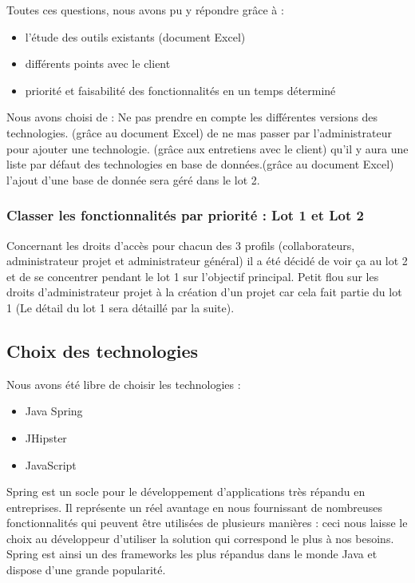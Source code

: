 Toutes ces questions, nous avons pu y répondre grâce à :
\begin{itemize}
\item l'étude des outils existants (document Excel)
\item différents points avec le client
\item priorité et faisabilité des fonctionnalités en un temps déterminé
\end{itemize}

Nous avons choisi de :
Ne pas prendre en compte les différentes versions des technologies. (grâce au document Excel)
de ne mas passer par l'administrateur pour ajouter une technologie. (grâce aux entretiens avec le client)
qu'il y aura une liste par défaut des technologies en base de données.(grâce au document Excel)
l'ajout d'une base de donnée sera géré dans le lot 2.

\subsubsection{Classer les fonctionnalités par priorité : Lot 1 et Lot 2}
Concernant les droits d’accès pour chacun des 3 profils (collaborateurs, administrateur projet et administrateur général) il a été décidé de voir ça au lot 2 et de se concentrer pendant le lot 1 sur l’objectif principal. Petit flou sur les droits d’administrateur projet à la création d’un projet car cela fait partie du lot 1 (Le détail du lot 1 sera détaillé par la suite).


\subsection{Choix des technologies}

Nous avons été libre de choisir les technologies : 
\begin{itemize}
\item Java Spring 
\item JHipster 
\item JavaScript
\end{itemize}

Spring est un socle pour le développement d'applications très répandu en entreprises. Il représente un réel avantage en nous fournissant de nombreuses fonctionnalités qui peuvent être utilisées de plusieurs manières : ceci nous laisse le choix au développeur d'utiliser la solution qui correspond le plus à nos besoins.
Spring est ainsi un des frameworks les plus répandus dans le monde Java et dispose d'une grande popularité.

